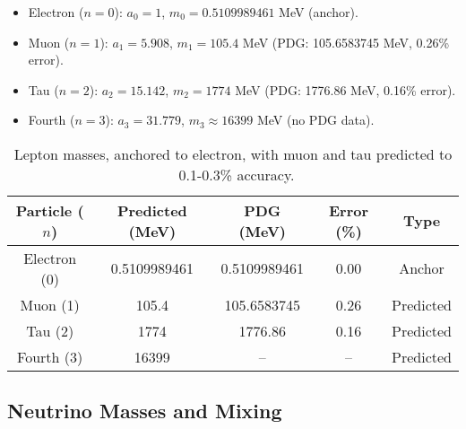 \begin{itemize}
\item Electron ($n=0$): $a_0 = 1$, $m_0 = 0.5109989461$ MeV (anchor).
\item Muon ($n=1$): $a_1 = 5.908$, $m_1 = 105.4$ MeV (PDG: 105.6583745 MeV, 0.26\% error).
\item Tau ($n=2$): $a_2 = 15.142$, $m_2 = 1774$ MeV (PDG: 1776.86 MeV, 0.16\% error).
\item Fourth ($n=3$): $a_3 = 31.779$, $m_3 \approx 16399$ MeV (no PDG data).
\end{itemize}

\begin{table}[ht!]
\centering
\begin{tabular}{|c|c|c|c|c|}
\hline
Particle ($n$) & Predicted (MeV) & PDG (MeV) & Error (\%) & Type \\
\hline
Electron (0) & 0.5109989461 & 0.5109989461 & 0.00 & Anchor \\
Muon (1) & 105.4 & 105.6583745 & 0.26 & Predicted \\
Tau (2) & 1774 & 1776.86 & 0.16 & Predicted \\
Fourth (3) & 16399 & -- & -- & Predicted \\
\hline
\end{tabular}
\caption{Lepton masses, anchored to electron, with muon and tau predicted to ~0.1-0.3\% accuracy.}
\label{tab:leptons}
\end{table}


\subsection{Neutrino Masses and Mixing}


